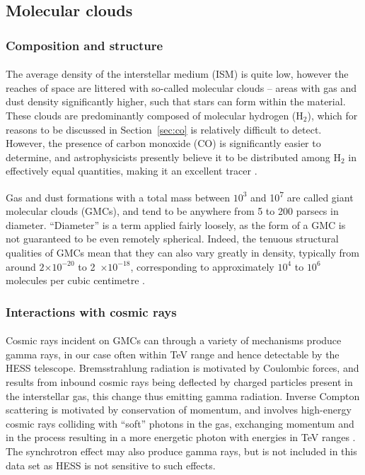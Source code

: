 \documentclass[a4paper, titlepage, oneside]{article}
\newcommand{\molec}[2]{\ensuremath{\text{#1}_{#2}}}
\newcommand{\e}[1]{\ensuremath{\times 10^{#1}}}
\newcommand{\smass}{\mathrm{M_\odot}}
\begin{document}
\begin{multicols}{2}
\subsection{Molecular clouds}
\subsubsection{Composition and structure}
\paragraph{}
The average density of the interstellar medium (ISM) is quite low, however the reaches of space are littered with so-called molecular clouds -- areas with gas and dust density significantly higher, such that stars can form within the material. These clouds are predominantly composed of molecular hydrogen (\molec{H}{2}), which for reasons to be discussed in Section~\ref{sec:co} is relatively difficult to detect. However, the presence of carbon monoxide (CO) is significantly easier to determine, and astrophysicists presently believe it to be distributed among \molec{H}{2} in effectively equal quantities, making it an excellent tracer \parencite{Glover:2011}.

Gas and dust formations with a total mass between \(10^3\) and \unit{10^7}{\smass} are called giant molecular clouds (GMCs), and tend to be anywhere from 5 to 200 parsecs in diameter. \parencite{Murray:2011} ``Diameter'' is a term applied fairly loosely, as the form of a GMC is not guaranteed to be even remotely spherical. Indeed, the tenuous structural qualities of GMCs mean that they can also vary greatly in density, typically from around \(2\e{-20}\) to \unit{2\e{-18}}{\gram\usk\centi\metre\rpcubed}, corresponding to approximately \(10^4\) to \(10^6\) molecules per cubic centimetre \parencite{Ferriere:2001}.

\subsubsection{Interactions with cosmic rays}
\paragraph{}
Cosmic rays incident on GMCs can through a variety of mechanisms produce gamma rays, in our case often within TeV range and hence detectable by the HESS telescope. Bremsstrahlung radiation is motivated by Coulombic forces, and results from inbound cosmic rays being deflected by charged particles present in the interstellar gas, this change thus emitting gamma radiation. Inverse Compton scattering is motivated by conservation of momentum, and involves high-energy cosmic rays colliding with ``soft'' photons in the gas, exchanging momentum and in the process resulting in a more energetic photon with energies in TeV ranges \parencite{Ferriere:2001}. The synchrotron effect may also produce gamma rays, but is not included in this data set as HESS is not sensitive to such effects.


\end{multicols}
\end{document}
